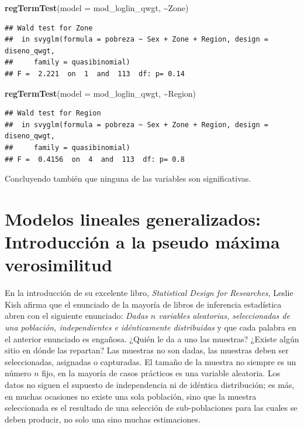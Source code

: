 \documentclass[
  12pt,
]{book}
\newenvironment{Shaded}{\begin{snugshade}}{\end{snugshade}}
\newcommand{\AttributeTok}[1]{\textcolor[rgb]{0.13,0.29,0.53}{#1}}
\newcommand{\FunctionTok}[1]{\textcolor[rgb]{0.13,0.29,0.53}{\textbf{#1}}}
\newcommand{\NormalTok}[1]{#1}
\newcommand{\SpecialCharTok}[1]{\textcolor[rgb]{0.81,0.36,0.00}{\textbf{#1}}}
\begin{document}
\begin{Shaded}
\begin{Highlighting}[]
\FunctionTok{regTermTest}\NormalTok{(}\AttributeTok{model =}\NormalTok{ mod\_loglin\_qwgt, }\SpecialCharTok{\textasciitilde{}}\NormalTok{Zone)}
\end{Highlighting}
\end{Shaded}

\begin{verbatim}
## Wald test for Zone
##  in svyglm(formula = pobreza ~ Sex + Zone + Region, design = diseno_qwgt, 
##     family = quasibinomial)
## F =  2.221  on  1  and  113  df: p= 0.14
\end{verbatim}

\begin{Shaded}
\begin{Highlighting}[]
\FunctionTok{regTermTest}\NormalTok{(}\AttributeTok{model =}\NormalTok{ mod\_loglin\_qwgt, }\SpecialCharTok{\textasciitilde{}}\NormalTok{Region)}
\end{Highlighting}
\end{Shaded}

\begin{verbatim}
## Wald test for Region
##  in svyglm(formula = pobreza ~ Sex + Zone + Region, design = diseno_qwgt, 
##     family = quasibinomial)
## F =  0.4156  on  4  and  113  df: p= 0.8
\end{verbatim}

Concluyendo también que ninguna de las variables son significativas.

\chapter{Modelos lineales generalizados: Introducción a la pseudo máxima verosimilitud}\label{modelos-lineales-generalizados-introducciuxf3n-a-la-pseudo-muxe1xima-verosimilitud}

En la introducción de su excelente libro, \emph{Statistical Design for Researches}, Leslie Kish afirma que el enunciado de la mayoría de libros de inferencia estadística abren con el siguiente enunciado: \emph{Dadas \(n\) variables aleatorias, seleccionadas de una población, independientes e idénticamente distribuidas} y que cada palabra en el anterior enunciado es engañosa. ¿Quién le da a uno las muestras? ¿Existe algún sitio en dónde las repartan? Las muestras no son dadas, las muestras deben ser seleccionadas, asignadas o capturadas. El tamaño de la muestra no siempre es un número \(n\) fijo, en la mayoría de casos prácticos es una variable aleatoria. Los datos no siguen el supuesto de independencia ni de idéntica distribución; es más, en muchas ocasiones no existe una sola población, sino que la muestra seleccionada es el resultado de una selección de sub-poblaciones para las cuales se deben producir, no solo una sino muchas estimaciones.
\end{document}
